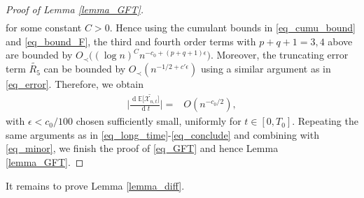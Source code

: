 \documentclass[10pt,reqno]{amsart}
\numberwithin{equation}{section}
\numberwithin{figure}{section}
\theoremstyle{plain}
\newcommand{\wt}{\widetilde}
\newcommand{\<}{\langle}
\renewcommand{\>}{\rangle}
\newcommand{\dd}{\operatorname{d}\!{}}
\begin{document}
\begin{proof}[Proof of Lemma \ref{lemma_GFT}]
\begin{align}
	\end{align}
for some constant $C>0$. Hence using the cumulant bounds in \eqref{eq_cumu_bound} and \eqref{eq_bound_F}, the third and fourth order terms with $p+q+1=3,4$ above are bounded by $O_\prec\Big((\log n)^{C}n^{-c_0+(p+q+1)\epsilon}\Big)$. Moreover, the truncating error term $\wt{R_5}$ can be bounded by $O_\prec(n^{-1/2+c'\epsilon})$ using a similar argument as in \eqref{eq_error}. Therefore, we obtain
	\begin{align}\label{eq_cumulant_exp_F}
		\Big|\frac{\dd \mathbb{E}\big[ \wt{\mathcal{X}_{n,t}}\big]}{\dd t} \Big|
		=&O(n^{-c_0/2}),
	\end{align}
with $\epsilon<c_0/100$ chosen sufficiently small, uniformly for $t\in [0,T_0]$. Repeating the same arguments as in \eqref{eq_long_time}-\eqref{eq_conclude} and combining with \eqref{eq_minor}, we finish the proof of \eqref{eq_GFT} and hence Lemma \ref{lemma_GFT}.	
\end{proof}

It remains to prove Lemma \ref{lemma_diff}.
\end{document}
